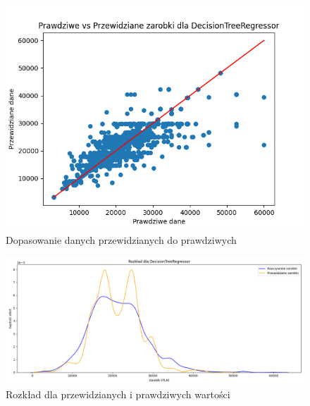 \documentclass[a4paper]{article}
\begin{document}
\begin{figure}[H]
    \centering
    \includegraphics[width=\textwidth]{../analysis/plots/wyniki/0.6&0.4/DecisionTreeRegressor/scatter.png}
    \caption{Dopasowanie danych przewidzianych do prawdziwych}
\end{figure}

\begin{figure}[H]
    \centering
    \includegraphics[width=\textwidth]{../analysis/plots/wyniki/0.6&0.4/DecisionTreeRegressor/salary_dist.png}
    \caption{Rozkład dla przewidzianych i prawdziwych wartości}
\end{figure}
\end{document}
